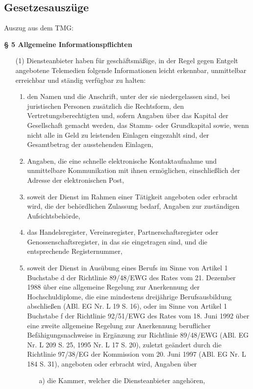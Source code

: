 \documentclass[12pt, twoside, a4paper, ngerman]{article}
\begin{document}
\begin{appendix}
\subsection{Gesetzesauszüge}\label{subsec:Gesetz}

Auszug aus dem \ac{TMG}:

\textbf{§ 5 Allgemeine Informationspflichten}
\begin{itemize}
\item[(1)] Diensteanbieter haben für geschäftsmäßige, in der Regel gegen Entgelt angebotene Telemedien folgende Informationen leicht erkennbar, unmittelbar erreichbar und ständig verfügbar zu halten:
  \begin{enumerate}
    \item den Namen und die Anschrift, unter der sie niedergelassen sind, bei juristischen Personen zusätzlich die Rechtsform, den Vertretungsberechtigten und, sofern Angaben über das Kapital der Gesellschaft gemacht werden, das Stamm- oder Grundkapital sowie, wenn nicht alle in Geld zu leistenden Einlagen eingezahlt sind, der Gesamtbetrag der ausstehenden Einlagen,
    \item Angaben, die eine schnelle elektronische Kontaktaufnahme und unmittelbare Kommunikation mit ihnen ermöglichen, einschließlich der Adresse der elektronischen Post,
    \item soweit der Dienst im Rahmen einer Tätigkeit angeboten oder erbracht wird, die der behördlichen Zulassung bedarf, Angaben zur zuständigen Aufsichtsbehörde,
    \item das Handelsregister, Vereinsregister, Partnerschaftsregister oder Genossenschaftsregister, in das sie eingetragen sind, und die entsprechende Registernummer,
    \item soweit der Dienst in Ausübung eines Berufs im Sinne von Artikel 1 Buchstabe d der Richtlinie 89/48/EWG des Rates vom 21. Dezember 1988 über eine allgemeine Regelung zur Anerkennung der Hochschuldiplome, die eine mindestens dreijährige Berufsausbildung abschließen (ABl. EG Nr. L 19 S. 16), oder im Sinne von Artikel 1 Buchstabe f der Richtlinie 92/51/EWG des Rates vom 18. Juni 1992 über eine zweite allgemeine Regelung zur Anerkennung beruflicher Befähigungsnachweise in Ergänzung zur Richtlinie 89/48/EWG (ABl. EG Nr. L 209 S. 25, 1995 Nr. L 17 S. 20), zuletzt geändert durch die Richtlinie 97/38/EG der Kommission vom 20. Juni 1997 (ABl. EG Nr. L 184 S. 31), angeboten oder erbracht wird, Angaben über
    \begin{itemize}
      \item[a)] die Kammer, welcher die Diensteanbieter angehören,

\end{itemize}
\end{enumerate}
\end{itemize}
\end{appendix}
\end{document}
